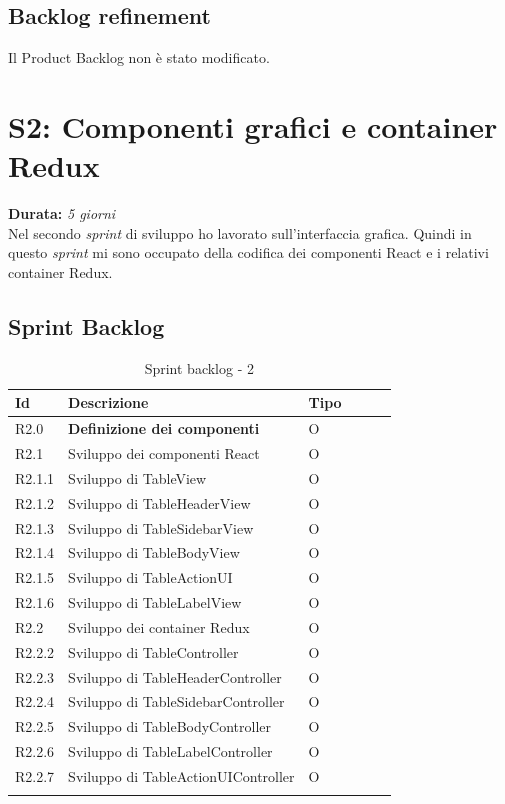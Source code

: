\subsection{Backlog refinement}
Il Product Backlog non è stato modificato.

\newpage

\section{S2: Componenti grafici e container Redux}
\textbf{Durata:} \textit{5 giorni} \\
Nel secondo \emph{sprint} di sviluppo ho lavorato sull'interfaccia grafica. Quindi in questo \emph{sprint} mi sono occupato della codifica dei componenti React e i relativi container Redux.

\subsection{Sprint Backlog}
\begin{longtable} {
		|>{}p{10mm}| 
		|>{}p{90mm}|
		|>{}p{15mm}|
		|>{}p{15mm}|
		|>{}p{15mm}|
		>{}p{0mm}}
	\hline
\textbf{Id} & \textbf{Descrizione} & \textbf{Tipo} \\ \hline
R2.0   & \textbf{Definizione dei componenti} & O\\ \hline
R2.1   & Sviluppo dei componenti React 		  & O\\ \hline
R2.1.1 & Sviluppo di TableView                & O\\ \hline
R2.1.2 & Sviluppo di TableHeaderView          & O\\ \hline
R2.1.3 & Sviluppo di TableSidebarView         & O \\ \hline
R2.1.4 & Sviluppo di TableBodyView            & O\\ \hline
R2.1.5 & Sviluppo di TableActionUI            & O\\ \hline
R2.1.6 & Sviluppo di TableLabelView            & O\\ \hline
R2.2   & Sviluppo dei container Redux         & O  \\ \hline
R2.2.2 & Sviluppo di TableController          & O   \\ \hline
R2.2.3 & Sviluppo di TableHeaderController    & O      \\ \hline
R2.2.4 & Sviluppo di TableSidebarController   & O      \\ \hline
R2.2.5 & Sviluppo di TableBodyController      & O   \\ \hline
R2.2.6 & Sviluppo di TableLabelController   & O      \\ \hline
R2.2.7 & Sviluppo di TableActionUIController      & O   \\ \hline
\caption{Sprint backlog - 2}
\end{longtable}

